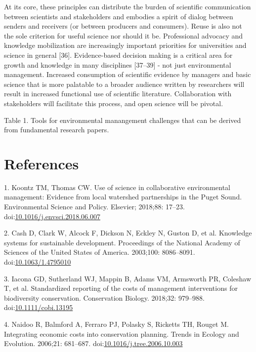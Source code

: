 \documentclass[10pt,letterpaper]{article}
\begin{document}
At its core, these principles can distribute the burden of scientific
communication between scientists and stakeholders and embodies a spirit
of dialog between senders and receivers (or between producers and
consumers). Reuse is also not the sole criterion for useful science nor
should it be. Professional advocacy and knowledge mobilization are
increasingly important priorities for universities and science in
general {[}36{]}. Evidence-based decision making is a critical area for
growth and knowledge in many disciplines {[}37--39{]} - not just
environmental management. Increased consumption of scientific evidence
by managers and basic science that is more palatable to a broader
audience written by researchers will result in increased functional use
of scientific literature. Collaboration with stakeholders will
facilitate this process, and open science will be pivotal.

Table 1. Tools for environmental manangement challenges that can be
derived from fundamental research papers.

\section*{References}\label{references}

\hypertarget{refs}{}
\hypertarget{ref-Koontz2018}{}
1. Koontz TM, Thomas CW. Use of science in collaborative environmental
management: Evidence from local watershed partnerships in the Puget
Sound. Environmental Science and Policy. Elsevier; 2018;88: 17--23.
doi:\href{https://doi.org/10.1016/j.envsci.2018.06.007}{10.1016/j.envsci.2018.06.007}

\hypertarget{ref-Cash2003}{}
2. Cash D, Clark W, Alcock F, Dickson N, Eckley N, Guston D, et al.
Knowledge systems for sustainable development. Proceedings of the
National Academy of Sciences of the United States of America. 2003;100:
8086--8091.
doi:\href{https://doi.org/10.1063/1.4795010}{10.1063/1.4795010}

\hypertarget{ref-Iacona2018}{}
3. Iacona GD, Sutherland WJ, Mappin B, Adams VM, Armsworth PR, Coleshaw
T, et al. Standardized reporting of the costs of management
interventions for biodiversity conservation. Conservation Biology.
2018;32: 979--988.
doi:\href{https://doi.org/10.1111/cobi.13195}{10.1111/cobi.13195}

\hypertarget{ref-Naidoo2006}{}
4. Naidoo R, Balmford A, Ferraro PJ, Polasky S, Ricketts TH, Rouget M.
Integrating economic costs into conservation planning. Trends in Ecology
and Evolution. 2006;21: 681--687.
doi:\href{https://doi.org/10.1016/j.tree.2006.10.003}{10.1016/j.tree.2006.10.003}
\end{document}
